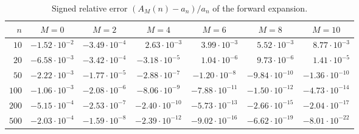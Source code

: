 \documentclass[11pt,a4paper,oneside]{book}
\theoremstyle{plain}
\theoremstyle{definition}
\theoremstyle{remark}
\begin{document}
\begin{table}[htbp]
\centering
\caption{Signed relative error $(A_M(n)-a_n)/a_n$ of the forward expansion.}
\label{p1:tab:forward-errors}
\scriptsize
\setlength{\tabcolsep}{4pt}
\begin{tabular}{rcccccc}
\toprule
$n$ & $M=0$ & $M=2$ & $M=4$ & $M=6$ & $M=8$ & $M=10$\\
\midrule
$10$  & $-1.52\cdot10^{-2}$ & $-3.49\cdot10^{-4}$ & $\phantom{-}2.63\cdot10^{-3}$ & $\phantom{-}3.99\cdot10^{-3}$ & $\phantom{-}5.52\cdot10^{-3}$ & $\phantom{-}8.77\cdot10^{-3}$\\
$20$  & $-6.58\cdot10^{-3}$ & $-3.42\cdot10^{-4}$ & $-3.18\cdot10^{-5}$ & $\phantom{-}1.04\cdot10^{-6}$ & $\phantom{-}9.73\cdot10^{-6}$ & $\phantom{-}1.41\cdot10^{-5}$\\
$50$  & $-2.22\cdot10^{-3}$ & $-1.77\cdot10^{-5}$ & $-2.88\cdot10^{-7}$ & $-1.20\cdot10^{-8}$ & $-9.84\cdot10^{-10}$ & $-1.36\cdot10^{-10}$\\
$100$ & $-1.06\cdot10^{-3}$ & $-2.08\cdot10^{-6}$ & $-8.06\cdot10^{-9}$ & $-7.88\cdot10^{-11}$ & $-1.50\cdot10^{-12}$ & $-4.73\cdot10^{-14}$\\
$200$ & $-5.15\cdot10^{-4}$ & $-2.53\cdot10^{-7}$ & $-2.40\cdot10^{-10}$ & $-5.73\cdot10^{-13}$ & $-2.66\cdot10^{-15}$ & $-2.04\cdot10^{-17}$\\
$500$ & $-2.03\cdot10^{-4}$ & $-1.59\cdot10^{-8}$ & $-2.39\cdot10^{-12}$ & $-9.02\cdot10^{-16}$ & $-6.62\cdot10^{-19}$ & $-8.01\cdot10^{-22}$\\
\bottomrule
\end{tabular}
\end{table}
\end{document}
